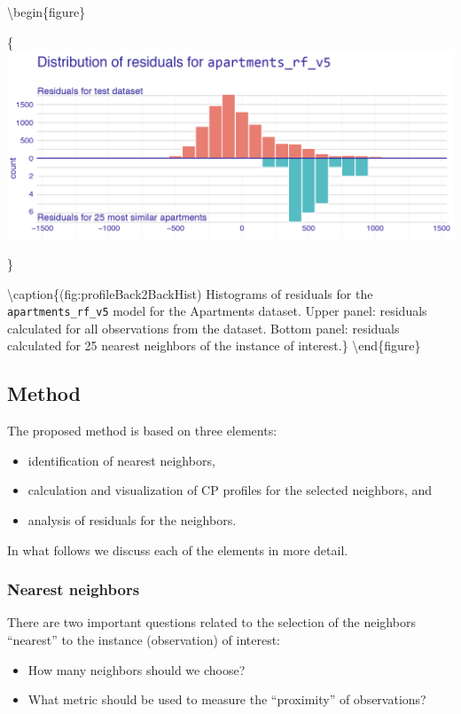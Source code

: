 \documentclass[12pt,]{krantz}
\providecommand{\tightlist}{%
  \setlength{\itemsep}{0pt}\setlength{\parskip}{0pt}}
\theoremstyle{definition}
\theoremstyle{definition}
\theoremstyle{definition}
\theoremstyle{remark}
\begin{document}
\textbackslash{}begin\{figure\}

\{\centering \includegraphics[width=0.7\linewidth]{figure/bb_hist}

\}

\textbackslash{}caption\{(fig:profileBack2BackHist) Histograms of
residuals for the \texttt{apartments\_rf\_v5} model for the Apartments
dataset. Upper panel: residuals calculated for all observations from the
dataset. Bottom panel: residuals calculated for 25 nearest neighbors of
the instance of interest.\}\label{fig:profileBack2BackHist}
\textbackslash{}end\{figure\}

\hypertarget{cPLocDiagMethod}{%
\subsection{Method}\label{cPLocDiagMethod}}

The proposed method is based on three elements:

\begin{itemize}
\tightlist
\item
  identification of nearest neighbors,
\item
  calculation and visualization of CP profiles for the selected
  neighbors, and
\item
  analysis of residuals for the neighbors.
\end{itemize}

In what follows we discuss each of the elements in more detail.

\hypertarget{cPLocDiagNeighbors}{%
\subsubsection{Nearest neighbors}\label{cPLocDiagNeighbors}}

There are two important questions related to the selection of the
neighbors ``nearest'' to the instance (observation) of interest:

\begin{itemize}
\tightlist
\item
  How many neighbors should we choose?
\item
  What metric should be used to measure the ``proximity'' of
  observations?
\end{itemize}
\end{document}
